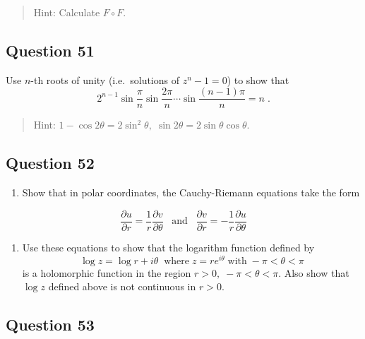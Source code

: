 \documentclass[12pt]{article}
\providecommand{\tightlist}{%
  \setlength{\itemsep}{0pt}\setlength{\parskip}{0pt}}
\begin{document}
\begin{quote}
Hint: Calculate \(F \circ F\).
\end{quote}

\hypertarget{question-51-2}{%
\subsection{Question 51}\label{question-51-2}}

Use \(n\)-th roots of unity (i.e.~solutions of \(z^n - 1 =0\)) to show
that
\[2^{n-1} \sin\frac{\pi}{n} \sin\frac{2\pi}{n} \cdots \sin\frac{(n-1)\pi}{n}
= n
\; .\]

\begin{quote}
Hint:
\(1 - \cos 2 \theta = 2 \sin^2 \theta,\; \sin 2 \theta = 2 \sin \theta \cos \theta\).
\end{quote}

\hypertarget{question-52-2}{%
\subsection{Question 52}\label{question-52-2}}

\begin{enumerate}
\def\labelenumi{(\alph{enumi})}
\tightlist
\item
  Show that in polar coordinates, the Cauchy-Riemann equations take the
  form
\end{enumerate}

\[\frac{\partial u}{\partial r} = \frac{1}{r} \frac{\partial v}{\partial \theta}
\; \; \; \text{and} \; \; \;
\frac{\partial v}{\partial r} = - \frac{1}{r} \frac{\partial u}{\partial \theta}\]

\begin{enumerate}
\def\labelenumi{(\alph{enumi})}
\setcounter{enumi}{1}
\tightlist
\item
  Use these equations to show that the logarithm function defined by
  \[\log z = \log r + i \theta \; \;
  \mbox{where} \; z = r e^{i \theta } \; \mbox{with} \; - \pi < \theta < \pi\]
  is a holomorphic function in the region
  \(r>0, \; - \pi < \theta < \pi\). Also show that \(\log z\) defined
  above is not continuous in \(r>0\).
\end{enumerate}

\hypertarget{question-53-2}{%
\subsection{Question 53}\label{question-53-2}}
\end{document}
